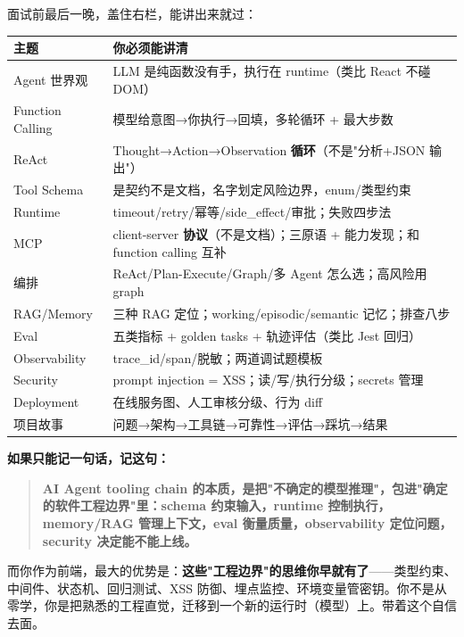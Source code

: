 面试前最后一晚，盖住右栏，能讲出来就过：

\begingroup
\scriptsize
\setlength{\tabcolsep}{3pt}
\begin{longtable}{|p{}|p{}|}
\hline
主题 & 你必须能讲清 \\ \hline
Agent 世界观 & LLM 是纯函数没有手，执行在 runtime（类比 React 不碰 DOM） \\ \hline
Function Calling & 模型给意图→你执行→回填，多轮循环 + 最大步数 \\ \hline
ReAct & Thought→Action→Observation \textbf{循环}（不是"分析+JSON 输出"） \\ \hline
Tool Schema & 是契约不是文档，名字划定风险边界，enum/类型约束 \\ \hline
Runtime & timeout/retry/幂等/side\_effect/审批；失败四步法 \\ \hline
MCP & client-server \textbf{协议}（不是文档）；三原语 + 能力发现；和 function calling 互补 \\ \hline
编排 & ReAct/Plan-Execute/Graph/多 Agent 怎么选；高风险用 graph \\ \hline
RAG/Memory & 三种 RAG 定位；working/episodic/semantic 记忆；排查八步 \\ \hline
Eval & 五类指标 + golden tasks + 轨迹评估（类比 Jest 回归） \\ \hline
Observability & trace\_id/span/脱敏；两道调试题模板 \\ \hline
Security & prompt injection = XSS；读/写/执行分级；secrets 管理 \\ \hline
Deployment & 在线服务图、人工审核分级、行为 diff \\ \hline
项目故事 & 问题→架构→工具链→可靠性→评估→踩坑→结果 \\ \hline
\end{longtable}
\endgroup

\textbf{如果只能记一句话，记这句：}

\begin{quote}
\textbf{AI Agent tooling chain 的本质，是把"不确定的模型推理"，包进"确定的软件工程边界"里：schema 约束输入，runtime 控制执行，memory/RAG 管理上下文，eval 衡量质量，observability 定位问题，security 决定能不能上线。}
\end{quote}

而你作为前端，最大的优势是：\textbf{这些"工程边界"的思维你早就有了}——类型约束、中间件、状态机、回归测试、XSS 防御、埋点监控、环境变量管密钥。你不是从零学，你是把熟悉的工程直觉，迁移到一个新的运行时（模型）上。带着这个自信去面。

